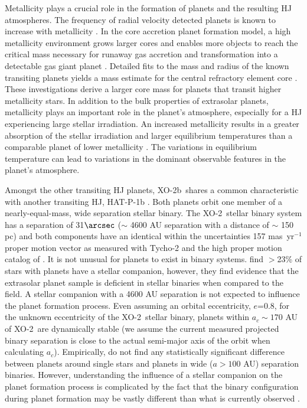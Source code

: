 \documentclass{emulateapj}
\newcommand{\xonb}{XO-2b}
\newcommand{\xon}{XO-2}
\newcommand{\vSepas}{31}
\begin{document}
Metallicity plays a crucial
role in the formation of planets and the resulting HJ atmospheres.
The frequency of radial velocity detected planets is known to increase
with metallicity \citep{FIS05}.  In the core accretion planet
formation model, a high metallicity environment grows larger cores
and enables more objects to reach the critical mass necessary for
runaway gas accretion and transformation into a detectable gas giant
planet \citep{IDA04,BENZ06}.  Detailed fits to the mass and radius of
the known transiting planets yields a mass estimate for the central
refractory element core \citep{GUI06,BUR06}.  These investigations
derive a larger core mass for planets that transit higher
metallicity stars.  In addition to the bulk properties of extrasolar
planets, metallicity plays an important role in the planet's
atmosphere, especially for a HJ experiencing large stellar irradiation.
An increased metallicity results in a greater absorption of the stellar
irradiation and larger equilibrium temperatures than a comparable
planet of lower metallicity \citep{FORT06}.  The variations in equilibrium
temperature can lead to variations in the dominant observable features
in the planet's atmosphere.

Amongst the other transiting HJ planets, \xonb\ shares a common
characteristic with another transiting HJ, HAT-P-1b \citep{BAK07}.
Both planets orbit one member of a nearly-equal-mass, wide separation
stellar binary.  The \xon\ stellar binary system has a separation of
\vSepas $\arcsec$ ($\sim$ 4600 AU separation with a distance of $\sim$
150 pc) and both components have an identical within the uncertainties
157 mas\ yr$^{-1}$ proper motion vector as measured with Tycho-2
\citep{HOG00} and the high proper motion catalog of
\citep{LEP05}.  It is not unusual for planets to exist in binary
systems.  \citet{RAG06} find $>$23\% of stars with planets have a
stellar companion, however, they find evidence that the extrasolar
planet sample is deficient in stellar binaries when compared to the
field.  A stellar companion with a 4600 AU separation is not expected
to influence the planet formation process.  Even assuming an orbital
eccentricity, $e$=0.8, for the unknown eccentricity of the
\xon\ stellar binary, planets within $a_{c}\sim 170$ AU of \xon\ are
dynamically stable \citep{HOL99} (we assume the current measured
projected binary separation is close to the actual semi-major axis of
the orbit when calculating $a_{c}$).  Empirically, \citet{DES07} do not
find any statistically significant difference between planets around
single stars and planets in wide ($a>100$ AU) separation binaries.
However, understanding the influence of a stellar companion on the
planet formation process is complicated by the fact that the binary
configuration during planet formation may be vastly different than
what is currently observed \citep{MAR07,MAL07}.
\end{document}
